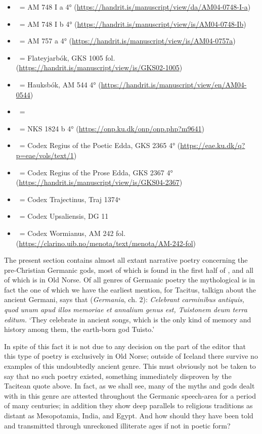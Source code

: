 \begin{itemize}%
	\item \AM\ = AM 748 I a 4° (\url{https://handrit.is/manuscript/view/da/AM04-0748-I-a})
	\item \AMb\ = AM 748 I b 4° (\url{https://handrit.is/manuscript/view/is/AM04-0748-Ib})
	\item \EddaBms\ = AM 757 a 4° (\url{https://handrit.is/manuscript/view/is/AM04-0757a})
	\item \FlatMS\ = Flateyjarbók, GKS 1005 fol. (\url{https://handrit.is/manuscript/view/is/GKS02-1005})
	\item \Hauksbok\ = Hauksbók, AM 544 4° (\url{https://handrit.is/manuscript/view/en/AM04-0544})
  \item \GylfMS\ = \RegiusProse\Trajectinus\Wormianus\Upsaliensis
	\item \VolsungaMS\ = NKS 1824 b 4° (\url{https://onp.ku.dk/onp/onp.php?m9641})
	\item \Regius\ = Codex Regius of the Poetic Edda, GKS 2365 4° (\url{https://eae.ku.dk/q?p=eae/vols/text/1})
	\item \RegiusProse\ = Codex Regius of the Prose Edda, GKS 2367 4° (\url{https://handrit.is/manuscript/view/is/GKS04-2367})
	\item \Trajectinus\ = Codex Trajectinus, Traj 1374ˣ
	\item \Upsaliensis\ = Codex Upsaliensis, DG 11
	\item \Wormianus\ = Codex Wormianus, AM 242 fol. (\url{https://clarino.uib.no/menota/text/menota/AM-242-fol})
\end{itemize}


The present section contains almost all extant narrative poetry concerning the pre-Christian Germanic gods, most of which is found in the first half of \Regius, and all of which is in Old Norse.
Of all genres of Germanic poetry the mythological is in fact the one of which we have the earliest mention, for Tacitus, talkign about the ancient Germani, says that (\emph{Germania}, ch. 2): \emph{Celebrant carminibus antiquis, quod unum apud illos memoriae et annalium genus est, Tuistonem deum terra editum.} ‘They celebrate in ancient songs, which is the only kind of memory and history among them, the earth-born god Tuisto.’

In spite of this fact it is not due to any decision on the part of the editor that this type of poetry is exclusively in Old Norse; outside of Iceland there survive no examples of this undoubtedly ancient genre.
This must obviously not be taken to say that no such poetry existed, something immediately disproven by the Tacitean quote above.  In fact, as we shall see, many of the myths and gods dealt with in this genre are attested throughout the Germanic speech-area for a period of many centuries; in addition they show deep parallels to religious traditions as distant as Mesopotamia, India, and Egypt.  And how should they have been told and transmitted through unreckoned illiterate ages if not in poetic form?

